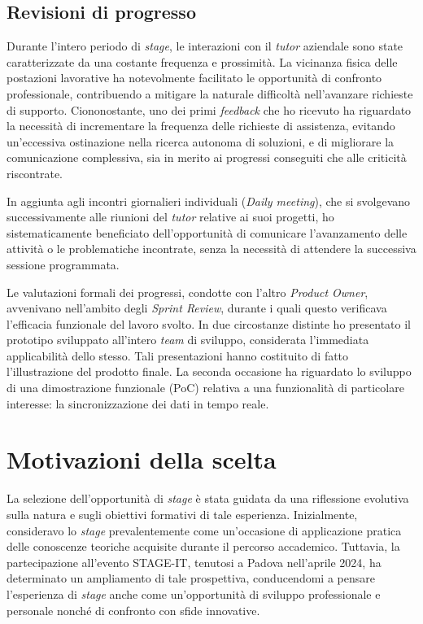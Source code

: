         \subsection{Revisioni di progresso}

        Durante l'intero periodo di \textit{stage}, le interazioni con il \textit{tutor} aziendale sono state caratterizzate da una costante frequenza e prossimità. La vicinanza fisica delle postazioni lavorative ha notevolmente facilitato le opportunità di confronto professionale, contribuendo a mitigare la naturale difficoltà nell'avanzare richieste di supporto. Ciononostante, uno dei primi \textit{feedback} che ho ricevuto ha riguardato la necessità di incrementare la frequenza delle richieste di assistenza, evitando un'eccessiva ostinazione nella ricerca autonoma di soluzioni, e di migliorare la comunicazione complessiva, sia in merito ai progressi conseguiti che alle criticità riscontrate.

        \vspace{0.2 em}
        \noindent In aggiunta agli incontri giornalieri individuali (\textit{Daily meeting}), che si svolgevano successivamente alle riunioni del \textit{tutor} relative ai suoi progetti, ho sistematicamente beneficiato dell'opportunità di comunicare l'avanzamento delle attività o le problematiche incontrate, senza la necessità di attendere la successiva sessione programmata.

        \vspace{0.2 em}
        \noindent Le valutazioni formali dei progressi, condotte con l'altro \textit{Product Owner}, avvenivano nell'ambito degli \textit{Sprint Review}, durante i quali questo verificava l'efficacia funzionale del lavoro svolto. In due circostanze distinte ho presentato il prototipo sviluppato all'intero \textit{team} di sviluppo, considerata l'immediata applicabilità dello stesso. Tali presentazioni hanno costituito di fatto l'illustrazione del prodotto finale. La seconda occasione ha riguardato lo sviluppo di una dimostrazione funzionale (PoC) relativa a una funzionalità di particolare interesse: la sincronizzazione dei dati in tempo reale.
        
    \section{Motivazioni della scelta}
    La selezione dell'opportunità di \textit{stage} è stata guidata da una riflessione evolutiva sulla natura e sugli obiettivi formativi di tale esperienza. Inizialmente, consideravo lo \textit{stage} prevalentemente come un'occasione di applicazione pratica delle conoscenze teoriche acquisite durante il percorso accademico. Tuttavia, la partecipazione all'evento STAGE-IT, tenutosi a Padova nell'aprile 2024, ha determinato un ampliamento di tale prospettiva, conducendomi a pensare l'esperienza di \textit{stage} anche come un'opportunità di sviluppo professionale e personale nonché di confronto con sfide innovative.

